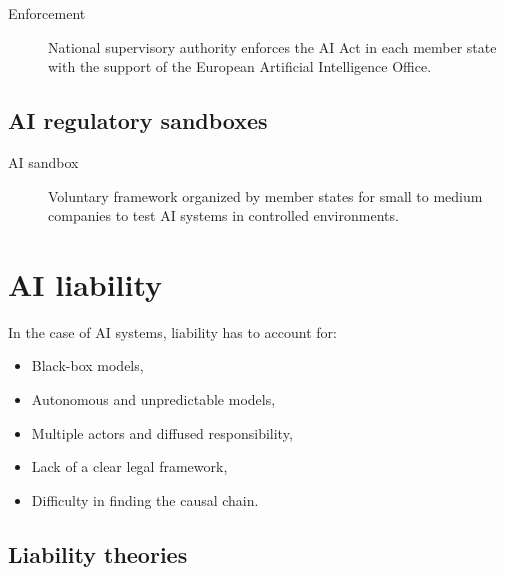 \begin{description}
    \item[Enforcement]  
        National supervisory authority enforces the AI Act in each member state with the support of the European Artificial Intelligence Office.
\end{description}


\subsection{AI regulatory sandboxes}

\begin{description}
    \item[AI sandbox] 
        Voluntary framework organized by member states for small to medium companies to test AI systems in controlled environments.
\end{description}



\section{AI liability}

\begin{remark}
    In the case of AI systems, liability has to account for:
    \begin{itemize}
        \item Black-box models,
        \item Autonomous and unpredictable models,
        \item Multiple actors and diffused responsibility,
        \item Lack of a clear legal framework,
        \item Difficulty in finding the causal chain.
    \end{itemize}
\end{remark}


\subsection{Liability theories}

